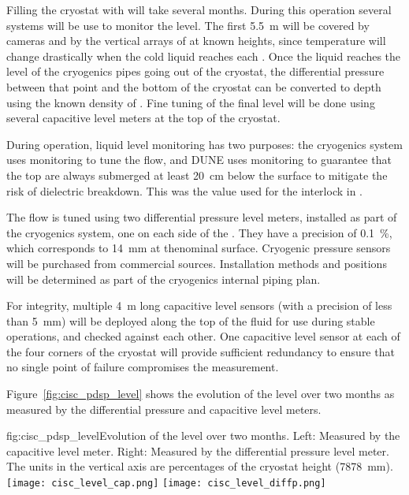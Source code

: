 Filling the cryostat with  will take several months. During this operation several systems will be use to monitor the  level. 
The first \SI{5.5}{m} will be covered by cameras and by the vertical arrays of  at known heights, since temperature will change drastically 
when the cold liquid reaches each . Once the liquid reaches the level of the cryogenics pipes going out of the cryostat, 
the differential pressure between that point and the bottom of the cryostat
can be converted to depth using
the known density of .   Fine tuning of the final  level will be done using several capacitive level meters at the top of the cryostat. 

During operation, liquid level monitoring has two purposes:
the  cryogenics system uses monitoring to tune the  flow, and 
DUNE uses monitoring to guarantee that the top  are always
submerged 
at least \SI{20}{cm} below the  surface to mitigate the risk of dielectric breakdown. This was the value used for the  interlock in . 

The  flow is tuned using two differential pressure level meters, installed as part of the cryogenics system, one on each side of the .  They have a precision of \SI{0.1}{\%}, which corresponds to \SI{14}{mm} at thenominal  surface. Cryogenic pressure sensors will be purchased from commercial sources. Installation methods and positions will be determined as part of the
cryogenics internal piping plan.  

For  integrity, multiple \SI{4}{m} long capacitive level sensors (with a precision of less than \SI{5}{mm}) will be deployed along the top of the fluid %
for use during stable operations, and checked against each other.
One capacitive level sensor at each of the four corners of the cryostat will provide sufficient redundancy to ensure that no single point of failure compromises the %
measurement.


Figure~\ref{fig:cisc_pdsp_level} shows the evolution of the   level over two months as measured by the differential pressure and capacitive level meters. 

\begin{dunefigure}{fig:cisc_pdsp_level}{Evolution of the   level over two months. Left: Measured by the capacitive level meter. Right: Measured by the differential pressure level meter. The units in the vertical axis are percentages of the cryostat height (\SI{7878}{mm}).}
  \texttt{[image: cisc\_level\_cap.png]}%
  \hspace*{1cm}
  \texttt{[image: cisc\_level\_diffp.png]}%
\end{dunefigure}

